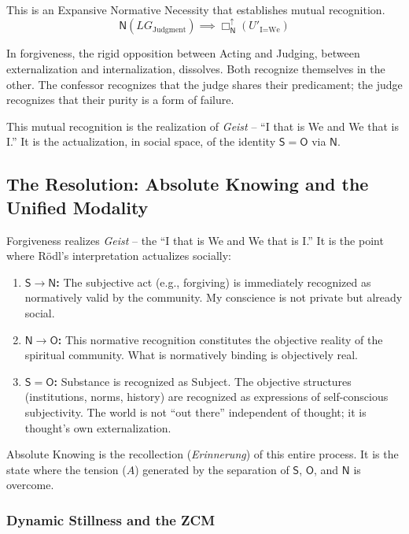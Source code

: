 \documentclass[12pt]{book}
\newcommand{\NBoxUp}{\Box_{\mathsf{N}}^{\uparrow}}
\begin{document}
\begin{enumerate}
This is an Expansive Normative Necessity that establishes mutual recognition.
\[
\mathsf{N}(LG_{\text{Judgment}}) \implies \NBoxUp(U'_{\text{I=We}})
\]

In forgiveness, the rigid opposition between Acting and Judging, between externalization and internalization, dissolves. Both recognize themselves in the other. The confessor recognizes that the judge shares their predicament; the judge recognizes that their purity is a form of failure.

This mutual recognition is the realization of \textit{Geist} -- ``I that is We and We that is I.'' It is the actualization, in social space, of the identity $\mathsf{S} = \mathsf{O}$ via $\mathsf{N}$.
\end{enumerate}

\subsection{The Resolution: Absolute Knowing and the Unified Modality}

Forgiveness realizes \textit{Geist} -- the ``I that is We and We that is I.'' It is the point where Rödl's interpretation actualizes socially:

\begin{enumerate}
\item \textbf{$\mathsf{S} \rightarrow \mathsf{N}$:} The subjective act (e.g., forgiving) is immediately recognized as normatively valid by the community. My conscience is not private but already social.

\item \textbf{$\mathsf{N} \rightarrow \mathsf{O}$:} This normative recognition constitutes the objective reality of the spiritual community. What is normatively binding is objectively real.

\item \textbf{$\mathsf{S} = \mathsf{O}$:} Substance is recognized as Subject. The objective structures (institutions, norms, history) are recognized as expressions of self-conscious subjectivity. The world is not ``out there'' independent of thought; it is thought's own externalization.
\end{enumerate}

Absolute Knowing is the recollection (\emph{Erinnerung}) of this entire process. It is the state where the tension ($A$) generated by the separation of $\mathsf{S}$, $\mathsf{O}$, and $\mathsf{N}$ is overcome.

\subsubsection{Dynamic Stillness and the ZCM}
\end{document}
